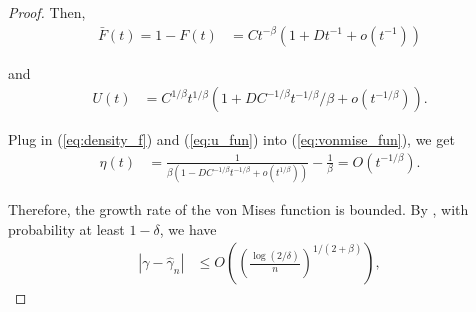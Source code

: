 \documentclass[12pt]{article}
\theoremstyle{plain}
\theoremstyle{definition}
\begin{document}
\begin{proof}
  Then,
  \begin{align*}
    \bar{F} (t) = 1 - F(t) & = Ct^{- \beta} (1 + Dt^{- 1} + o (t^{- 1}))
  \end{align*}
  
  and
  \begin{align}
    U (t) & = C^{1 / \beta} t^{1 / \beta} (1 + DC^{- 1 / \beta} t^{- 1 /
    \beta} / \beta + o (t^{- 1 / \beta})) .  \label{eq:u_fun}
  \end{align}
  
  Plug in (\ref{eq:density_f}) and (\ref{eq:u_fun}) into
  (\ref{eq:vonmise_fun}), we get
  \begin{align*}
    \eta (t) & = \frac{1}{\beta (1 - DC^{- 1 / \beta} t^{- 1 / \beta} + o
    (t^{1 / \beta}))} - \frac{1}{\beta} = O (t^{- 1 / \beta}) .
  \end{align*}
  
  Therefore, the growth rate of the von Mises function is bounded. By
  {\citep{boucheron2015tail}}, with probability at least $1 - \delta$, we have
  \begin{align*}
    | \gamma - \hat{\gamma}_n | & \leqslant O \left( \left( \frac{\log (2 /
    \delta)}{n} \right)^{1 / (2 + \beta)} \right),
  \end{align*}
\end{proof}
\end{document}
